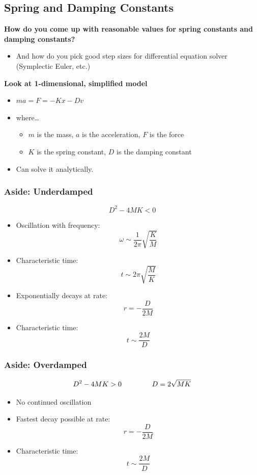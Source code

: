 \documentclass{article}
\begin{document}
\subsection*{Spring and Damping Constants}
\textbf{How do you come up with reasonable values for spring constants and damping constants?}
\begin{itemize}
    \item And how do you pick good step sizes for differential equation solver (Symplectic Euler, etc.)
\end{itemize}
\textbf{Look at 1-dimensional, simplified model}
\begin{itemize}
    \item $ma = F = -Kx - Dv$
    \item where\dots
    \begin{itemize}
        \item $m$ is the mass, $a$ is the acceleration, $F$ is the force
        \item $K$ is the spring constant, $D$ is the damping constant
    \end{itemize}
    \item Can solve it analytically.
\end{itemize}

\subsubsection*{Aside: Underdamped}
\[D^2 - 4MK < 0\]
\begin{itemize}
    \item Oscillation with frequency:
    \[\omega \sim \frac{1}{2\pi} \sqrt{\frac{K}{M}}\]
    \item Characteristic time:
    \[t \sim 2\pi \sqrt{\frac{M}{K}}\]
    \item Exponentially decays at rate:
    \[r = - \frac{D}{2M}\]
    \item Characteristic time:
    \[t \sim \frac{2M}{D}\]
\end{itemize}

\subsubsection*{Aside: Overdamped}
\[D^2 - 4MK > 0\hspace{1.5cm}D = 2\sqrt{MK}\]
\begin{itemize}
    \item No continued oscillation
    \item Fastest decay possible at rate:
    \[r = -\frac{D}{2M}\]
    \item Characteristic time:
    \[t \sim \frac{2M}{D}\]
\end{itemize}
\end{document}
